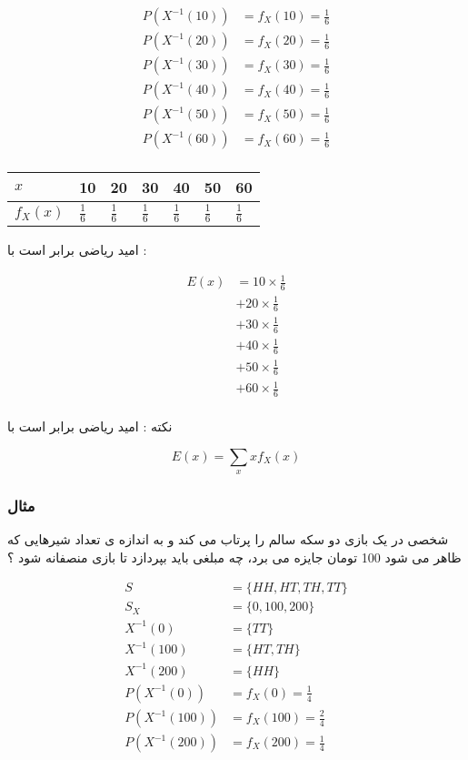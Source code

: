 \documentclass[12pt]{book}
\begin{document}
\begin{align*}
P(X^{-1}(10)) &= f_{X}(10) = \frac{1}{6} \\
P(X^{-1}(20)) &= f_{X}(20) = \frac{1}{6} \\
P(X^{-1}(30)) &= f_{X}(30) = \frac{1}{6} \\
P(X^{-1}(40)) &= f_{X}(40) = \frac{1}{6} \\
P(X^{-1}(50)) &= f_{X}(50) = \frac{1}{6} \\
P(X^{-1}(60)) &= f_{X}(60) = \frac{1}{6} \\
\end{align*}



\begin{center}
\begin{latin}
\begin{tabular}{ l |  l  l  l  l  l  l }
  $x$ & 10 & 20 & 30 & 40  & 50 & 60 \\
  \hline
  $f_{X}(x)$ & $\frac{1}{6}$ & $\frac{1}{6}$ & $\frac{1}{6}$  & $\frac{1}{6}$ & $\frac{1}{6}$ & $\frac{1}{6}$ \\
\end{tabular}
\end{latin}
\end{center}


امید ریاضی برابر است با :

\begin{align*}
E(x) &= 10 \times \frac{1}{6} \\
&+ 20 \times \frac{1}{6} \\
&+ 30 \times \frac{1}{6} \\
&+ 40 \times \frac{1}{6} \\
&+ 50 \times \frac{1}{6} \\
&+ 60 \times \frac{1}{6} \\
\end{align*}


نکته : امید ریاضی برابر است با 

$$
E(x) = \sum_{x}{xf_{X}(x)}
$$


\subsubsection{مثال}
شخصی در یک بازی دو سکه سالم را پرتاب می کند و به اندازه ی تعداد شیرهایی که ظاهر می شود 100 تومان جایزه می برد، چه مبلغی باید بپردازد تا بازی منصفانه شود ؟

\begin{align*}
S &= \{ HH, HT, TH, TT \} \\
S_{X} &= \{ 0, 100, 200 \} \\
X^{-1}(0) &= \{ TT \} \\
X^{-1}(100) &= \{ HT, TH \} \\
X^{-1}(200) &= \{ HH \} \\
P(X^{-1}(0)) &= f_{X}(0) = \frac{1}{4} \\
P(X^{-1}(100)) &= f_{X}(100) = \frac{2}{4} \\
P(X^{-1}(200)) &= f_{X}(200) = \frac{1}{4} \\
\end{align*}
\end{document}
